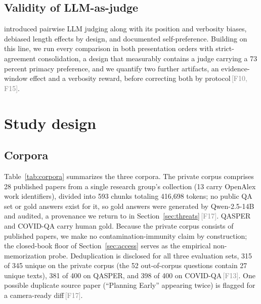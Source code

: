 \documentclass[11pt]{article}
\newcommand{\rcpt}[1]{\textcolor{gray}{\,\textsf{\scriptsize[#1]}}}
\begin{document}
\subsection{Validity of LLM-as-judge}
\citet{zheng2023judging} introduced pairwise LLM judging along with its position and verbosity biases, \citet{dubois2024length} debiased length effects by design, and \citet{panickssery2024self} documented self-preference. Building on this line, we run every comparison in both presentation orders with strict-agreement consolidation, a design that measurably contains a judge carrying a 73 percent primacy preference, and we quantify two further artifacts, an evidence-window effect and a verbosity reward, before correcting both by protocol\rcpt{F10, F15}.

\section{Study design}
\label{sec:design}

\subsection{Corpora}
\label{sec:corpora}

Table~\ref{tab:corpora} summarizes the three corpora. The private corpus comprises 28 published papers from a single research group's collection (13 carry OpenAlex work identifiers), divided into 593 chunks totaling 416,698 tokens; no public QA set or gold answers exist for it, so gold answers were generated by Qwen-2.5-14B and audited, a provenance we return to in Section~\ref{sec:threats}\rcpt{F17}. QASPER \citep{dasigi2021qasper} and COVID-QA \citep{moller2020covidqa} carry human gold. Because the private corpus consists of published papers, we make no contamination-immunity claim by construction; the closed-book floor of Section~\ref{sec:access} serves as the empirical non-memorization probe. Deduplication is disclosed for all three evaluation sets, 315 of 345 unique on the private corpus (the 52 out-of-corpus questions contain 27 unique texts), 381 of 400 on QASPER, and 398 of 400 on COVID-QA\rcpt{F13}. One possible duplicate source paper (``Planning Early'' appearing twice) is flagged for a camera-ready diff\rcpt{F17}.
\end{document}
